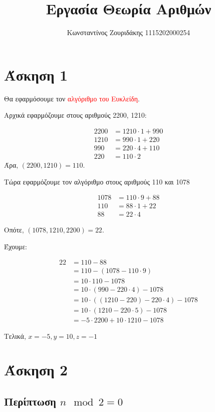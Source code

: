\documentclass[11pt, oneside]{article}   	%
\title{Εργασία Θεωρία Αριθμών}
\author{\Large Κωνσταντίνος Ζουριδάκης 1115202000254}
\date{}							%
\begin{document}
\maketitle

\section{Άσκηση 1}
Θα εφαρμόσουμε τον \textcolor{red}{αλγόριθμο του Ευκλείδη}.

Αρχικά εφαρμόζουμε στους αριθμούς 2200, 1210:

\begin{align*}
	2200 &= 1210 \cdot 1 + 990 \\
	1210 &= 990 \cdot 1 + 220 \\
	990 &= 220 \cdot 4+ 110 \\
	220 &= 110 \cdot 2
\end{align*}
Άρα, $(2200, 1210)= 110$.

Τώρα εφαρμόζουμε τον αλγόριθμο στους αριθμούς 110 και 1078

\begin{align*}
	1078 &= 110 \cdot 9+ 88 \\
	110 &= 88 \cdot 1 + 22 \\
	88 &= 22 \cdot 4
\end{align*}

Οπότε, $(1078, 1210, 2200) = 22$.

Έχουμε:

\begin{align*}
	22 &= 110 - 88 \\
	&= 110 - (1078 - 110 \cdot 9) \\
	&= 10 \cdot 110 - 1078 \\
	&= 10 \cdot (990 - 220 \cdot 4) - 1078 \\
	&= 10 \cdot ((1210-220) - 220 \cdot 4)-1078 \\
	&= 10 \cdot (1210 - 220 \cdot 5) - 1078 \\
	&= - 5 \cdot 2200 + 10 \cdot 1210 - 1078
\end{align*}

Τελικά, $x=-5, y=10, z=-1$

\section{Άσκηση 2}

\subsection{Περίπτωση $n \mod 2 = 0$}
\end{document}
